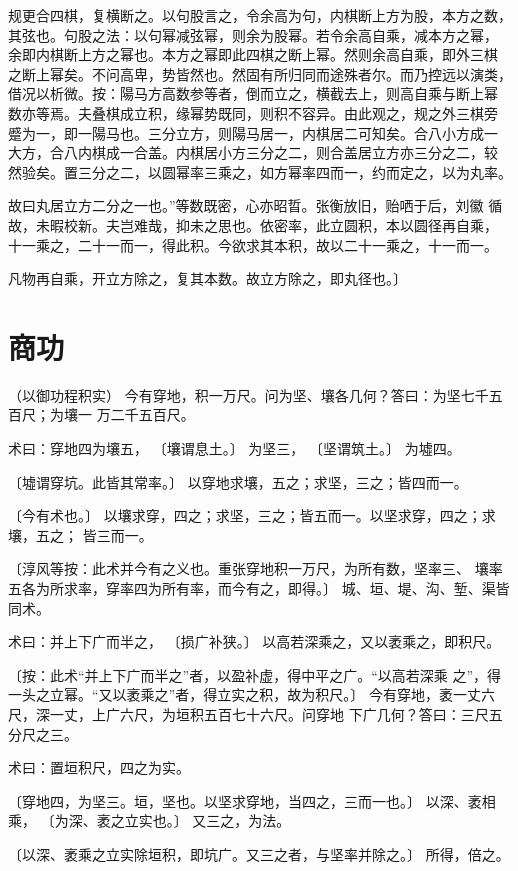 \documentclass[12pt,UTF8]{ctexbook}
\begin{document}
规更合四棋，复横断之。以句股言之，令余高为句，内棋断上方为股，本方之数， 其弦也。句股之法：以句幂减弦幂，则余为股幂。若令余高自乘，减本方之幂， 余即内棋断上方之幂也。本方之幂即此四棋之断上幂。然则余高自乘，即外三棋 之断上幂矣。不问高卑，势皆然也。然固有所归同而途殊者尔。而乃控远以演类， 借况以析微。按：陽马方高数参等者，倒而立之，横截去上，则高自乘与断上幂 数亦等焉。夫叠棋成立积，缘幂势既同，则积不容异。由此观之，规之外三棋旁 蹙为一，即一陽马也。三分立方，则陽马居一，内棋居二可知矣。合八小方成一 大方，合八内棋成一合盖。内棋居小方三分之二，则合盖居立方亦三分之二，较 然验矣。置三分之二，以圆幂率三乘之，如方幂率四而一，约而定之，以为丸率。

故曰丸居立方二分之一也。”等数既密，心亦昭晢。张衡放旧，贻哂于后，刘徽 循故，未暇校新。夫岂难哉，抑未之思也。依密率，此立圆积，本以圆径再自乘， 十一乘之，二十一而一，得此积。今欲求其本积，故以二十一乘之，十一而一。

凡物再自乘，开立方除之，复其本数。故立方除之，即丸径也。〕

\chapter{商功}
（以御功程积实） 今有穿地，积一万尺。问为坚、壤各几何？答曰：为坚七千五百尺；为壤一 万二千五百尺。

术曰：穿地四为壤五， 〔壤谓息土。〕 为坚三， 〔坚谓筑土。〕 为墟四。

〔墟谓穿坑。此皆其常率。〕 以穿地求壤，五之；求坚，三之；皆四而一。

〔今有术也。〕 以壤求穿，四之；求坚，三之；皆五而一。以坚求穿，四之；求壤，五之； 皆三而一。

〔淳风等按：此术并今有之义也。重张穿地积一万尺，为所有数，坚率三、 壤率五各为所求率，穿率四为所有率，而今有之，即得。〕 城、垣、堤、沟、堑、渠皆同术。

术曰：并上下广而半之， 〔损广补狭。〕 以高若深乘之，又以袤乘之，即积尺。

〔按：此术“并上下广而半之”者，以盈补虚，得中平之广。“以高若深乘 之”，得一头之立幂。“又以袤乘之”者，得立实之积，故为积尺。〕 今有穿地，袤一丈六尺，深一丈，上广六尺，为垣积五百七十六尺。问穿地 下广几何？答曰：三尺五分尺之三。

术曰：置垣积尺，四之为实。

〔穿地四，为坚三。垣，坚也。以坚求穿地，当四之，三而一也。〕 以深、袤相乘， 〔为深、袤之立实也。〕 又三之，为法。

〔以深、袤乘之立实除垣积，即坑广。又三之者，与坚率并除之。〕 所得，倍之。
\end{document}
